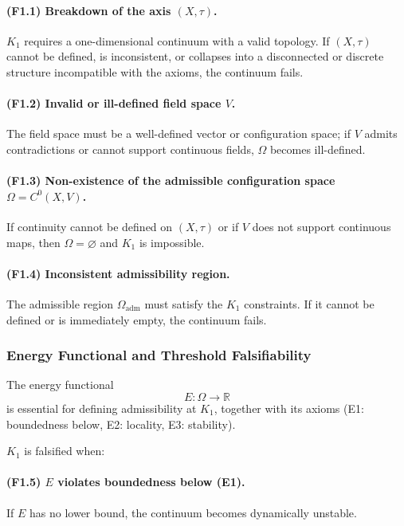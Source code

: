 \paragraph{(F1.1) Breakdown of the axis \texorpdfstring{$(X,\tau)$}{(X,\tau)}.}
$K_1$ requires a one-dimensional continuum with a valid topology.
If $(X,\tau)$ cannot be defined, is inconsistent, or collapses into a
disconnected or discrete structure incompatible with the axioms, the
continuum fails.

\paragraph{(F1.2) Invalid or ill-defined field space \texorpdfstring{$V$}{V}.}
The field space must be a well-defined vector or configuration space;
if $V$ admits contradictions or cannot support continuous fields,
$\Omega$ becomes ill-defined.

\paragraph{(F1.3) Non-existence of the admissible configuration space \texorpdfstring{$\Omega=C^0(X,V)$}{\Omega=C^0(X,V)}.}
If continuity cannot be defined on $(X,\tau)$ or if $V$ does not support
continuous maps, then $\Omega=\varnothing$ and $K_1$ is impossible.

\paragraph{(F1.4) Inconsistent admissibility region.}
The admissible region $\Omega_{\mathrm{adm}}$ must satisfy the $K_1$
constraints.
If it cannot be defined or is immediately empty, the continuum fails.



\subsubsection{Energy Functional and Threshold Falsifiability}

The energy functional
\[
E : \Omega \to \mathbb{R}
\]
is essential for defining admissibility at $K_1$, together with its axioms
(E1: boundedness below, E2: locality, E3: stability).

$K_1$ is falsified when:

\paragraph{(F1.5) \texorpdfstring{$E$}{E} violates boundedness below (E1).}
If $E$ has no lower bound, the continuum becomes dynamically unstable.

